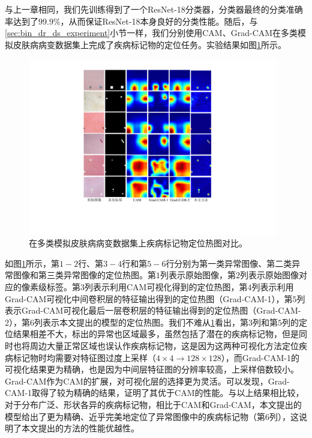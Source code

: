 与上一章相同，我们先训练得到了一个ResNet-18分类器，分类器最终的分类准确率达到了$99.9\%$，从而保证ResNet-18本身良好的分类性能。随后，与\ref{sec:bin_dr_ds_experiment}小节一样，我们分别使用CAM、Grad-CAM在多类模拟皮肤病病变数据集上完成了疾病标记物的定位任务。实验结果如图\ref{fig:multi_simulated_skin_res}所示。
\begin{figure}[h]
	\centering
	\includegraphics[width=0.975\textwidth]{figure/multi_simulated_skin_res.pdf}
	\caption[在多类模拟皮肤病病变数据集上疾病标记物定位热图对比]{在多类模拟皮肤病病变数据集上疾病标记物定位热图对比。}
	\label{fig:multi_simulated_skin_res}
\end{figure}

如图\ref{fig:multi_simulated_skin_res}所示，第$1-2$行、第$3-4$行和第$5-6$行分别为第一类异常图像、第二类异常图像和第三类异常图像的定位热图。第$1$列表示原始图像，第$2$列表示原始图像对应的像素级标签。第$3$列表示利用CAM可视化得到的定位热图，第$4$列表示利用Grad-CAM可视化中间卷积层的特征输出得到的定位热图（Grad-CAM-1），第$5$列表示Grad-CAM可视化最后一层卷积层的特征输出得到的定位热图（Grad-CAM-2），第$6$列表示本文提出的模型的定位热图。我们不难从\ref{fig:multi_simulated_skin_res}看出，第$3$列和第$5$列的定位结果相差不大，标出的异常也区域最多，虽然包括了潜在的疾病标记物，但是同时也将周边大量正常区域也误认作疾病标记物，这是因为这两种可视化方法定位疾病标记物时均需要对特征图过度上采样（$4\times 4\rightarrow 128\times 128$），而Grad-CAM-1的可视化结果更为精确，也是因为中间层特征图的分辨率较高，上采样倍数较小。Grad-CAM作为CAM的扩展，对可视化层的选择更为灵活。可以发现，Grad-CAM-1取得了较为精确的结果，证明了其优于CAM的性能。与以上结果相比较，对于分布广泛、形状各异的疾病标记物，相比于CAM和Grad-CAM，本文提出的模型给出了更为精确、近乎完美地定位了异常图像中的疾病标记物（第$6$列），这说明了本文提出的方法的性能优越性。

